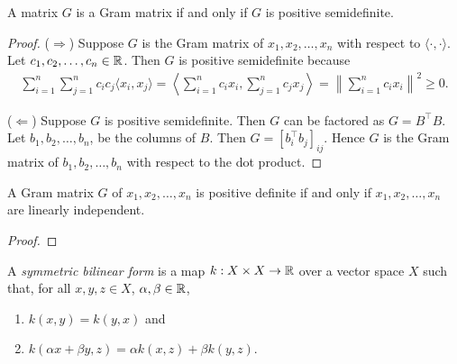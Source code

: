 \begin{theorem}
    \cite{horn2013matrix}
    \label{thm:gram-spsd}
    A matrix \(G\) is a Gram matrix if and only if \(G\) is positive semidefinite.
\end{theorem}
\begin{proof}
    (\(\Rightarrow\))
    Suppose \(G\) is the Gram matrix of \(x_1, x_2, \dots, x_n\) with respect to \(\langle \cdot, \cdot \rangle\).
    Let \(c_1, c_2, \dots, c_n \in \mathbb{R}\).
    Then \(G\) is positive semidefinite because
    \begin{align}
        \sum_{i=1}^{n} \sum_{j=1}^{n} c_i c_j \langle x_i, x_j \rangle
        = \left\langle
            \sum_{i=1}^{n} c_i x_i, \sum_{j=1}^{n} c_j x_j
        \right\rangle
        = \left\|
            \sum_{i=1}^{n} c_i x_i
        \right\|^2
        \geq 0.
    \end{align}

    (\(\Leftarrow\))
    Suppose \(G\) is positive semidefinite.
    Then \(G\) can be factored as \(G = B^\top B\).
    Let \(b_1, b_2, \dots, b_n\), be the columns of \(B\).
    Then \(G = [b_i^\top b_j]_{ij}\).
    Hence \(G\) is the Gram matrix of \(b_1, b_2, \dots, b_n\) with respect to the dot product.
\end{proof}

\begin{theorem}
    \cite{horn2013matrix}
    A Gram matrix \(G\) of \(x_1, x_2, \dots, x_n\) is positive definite if and only if \(x_1, x_2, \dots, x_n\) are linearly independent.
\end{theorem}
\begin{proof}
    
\end{proof}

\begin{definition}
    \label{def:symmetric-bilinear-form}
    A \textit{symmetric bilinear form} is a map \(k : X \times X \to \mathbb{R}\) over a vector space \(X\) such that, for all \(x,y,z \in X\), \(\alpha, \beta \in \mathbb{R}\),
    \begin{enumerate}
        \item \(k(x,y) = k(y,x)\) and
        \item \(k(\alpha x + \beta y, z) = \alpha k(x,z) + \beta k(y,z)\).
    \end{enumerate}
\end{definition}

